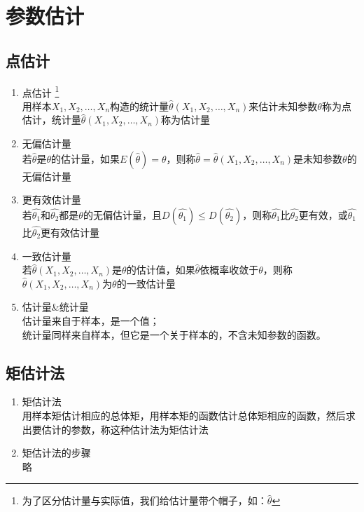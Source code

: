 \section{参数估计}
\subsection{点估计}
\begin{enumerate}
	\item 点估计 
	\footnote{为了区分估计量与实际值，我们给估计量带个帽子，如：$\hat{\theta}$} \\
	用样本$X_1, X_2, \dots, X_n$构造的统计量$\hat{\theta}(X_1, X_2, \dots, X_n)$来估计未知参数$\theta$称为点估计，统计量$\hat{\theta}(X_1, X_2, \dots, X_n)$称为估计量
	\item 无偏估计量 \\
	若$\hat{\theta}$是$\theta$的估计量，如果$E(\hat{\theta})=\theta$，则称$\hat{\theta} = \hat{\theta}(X_1, X_2, \dots, X_n)$是未知参数$\theta$的无偏估计量
	\item 更有效估计量 \\
	若$\hat{\theta_1}$和$\hat{\theta_2}$都是$\theta$的无偏估计量，且$D(\hat{\theta_1})\leq D(\hat{\theta_2})$，则称$\hat{\theta_1}$比$\hat{\theta_2}$更有效，或$\hat{\theta_1}$比$\hat{\theta_2}$更有效估计量
	\item 一致估计量 \\
	若$\hat{\theta}(X_1, X_2, \dots, X_n)$是$\theta$的估计值，如果$\hat{\theta}$依概率收敛于$\theta$，则称$\hat{\theta}(X_1, X_2, \dots, X_n)$为$\theta$的一致估计量
	\item 估计量\&统计量 \\
	估计量来自于样本，是一个值；\\
	统计量同样来自样本，但它是一个关于样本的，不含未知参数的函数。
\end{enumerate}

\subsection{矩估计法}
\begin{enumerate}
	\item 矩估计法 \\
	用样本矩估计相应的总体矩，用样本矩的函数估计总体矩相应的函数，然后求出要估计的参数，称这种估计法为矩估计法
	\item 矩估计法的步骤 \\
	略
\end{enumerate}

